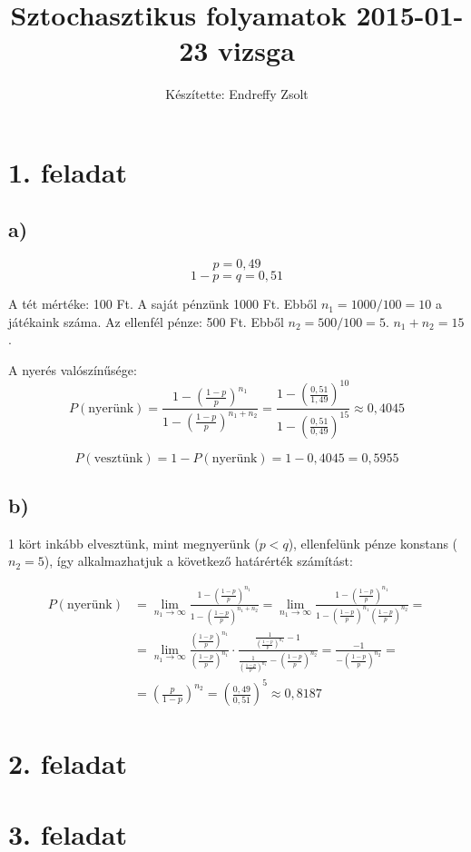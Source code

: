 \documentclass[a4paper,12pt]{article}   		%
\title{Sztochasztikus folyamatok 2015-01-23 vizsga}
\author{Készítette: Endreffy Zsolt}
\begin{document}
\section*{1. feladat}
\subsection*{a)}
\[p = 0,49\]
\[1-p = q = 0,51\]

A tét mértéke: 100 Ft. A saját pénzünk 1000 Ft. Ebből $n_1 = 1000/100=10$ a 
játékaink száma. Az ellenfél pénze: 500 Ft. Ebből $n_2 = 500/100=5$.
$n_1 + n_2 = 15$.

A nyerés valószínűsége:
\[P(\text{nyerünk}) = \frac{1-\left(\frac{1-p}{p}\right)^{n_1}}
{1-\left(\frac{1-p}{p}\right)^{n_1+n_2}} = 
\frac{1-\left(\frac{0,51}{1,49}\right)^{10}}
{1-\left(\frac{0,51}{0,49}\right)^{15}} \approx 0,4045 \]

\[P(\text{vesztünk}) = 1 - P(\text{nyerünk}) = 1 - 0,4045 = 0,5955\]

\subsection*{b)}
1 kört inkább elvesztünk, mint megnyerünk ($p<q$), ellenfelünk pénze konstans
($n_2 = 5$), így alkalmazhatjuk a következő határérték számítást:

\[
\begin{split}
P(\text{nyerünk}) &= 
\lim_{n_1 \to \infty} \frac{1-\left(\frac{1-p}{p}\right)^{n_1}}
{1-\left(\frac{1-p}{p}\right)^{n_1+n_2}} =
\lim_{n_1 \to \infty} \frac{1-\left(\frac{1-p}{p}\right)^{n_1}}
{1-\left(\frac{1-p}{p}\right)^{n_1}\left(\frac{1-p}{p}\right)^{n_2}} =\\
&= \lim_{n_1 \to \infty} \frac{\left(\frac{1-p}{p}\right)^{n_1}}
{\left(\frac{1-p}{p}\right)^{n_1}} \cdot 
\frac{\frac{1}{\left(\frac{1-p}{p}\right)^{n_1}}-1}
{\frac{1}{\left(\frac{1-p}{p}\right)^{n_1}} -
\left(\frac{1-p}{p}\right)^{n_2}} 
= \frac{-1}{-\left(\frac{1-p}{p}\right)^{n_2}} =\\
&= \left(\frac{p}{1-p}\right)^{n_2} = 
\left(\frac{0,49}{0,51}\right)^{5} \approx 0,8187
\end{split}
\]
\section*{2. feladat}
\section*{3. feladat}
\end{document}
